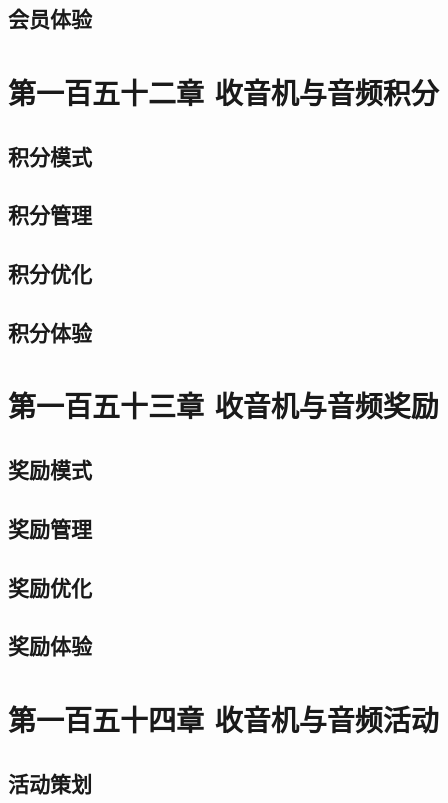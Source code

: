 \documentclass[12pt,UTF8]{ctexbook}
\begin{document}
\section{会员体验}

\chapter{第一百五十二章 收音机与音频积分}

\section{积分模式}
\section{积分管理}
\section{积分优化}
\section{积分体验}

\chapter{第一百五十三章 收音机与音频奖励}

\section{奖励模式}
\section{奖励管理}
\section{奖励优化}
\section{奖励体验}

\chapter{第一百五十四章 收音机与音频活动}

\section{活动策划}
\end{document}
